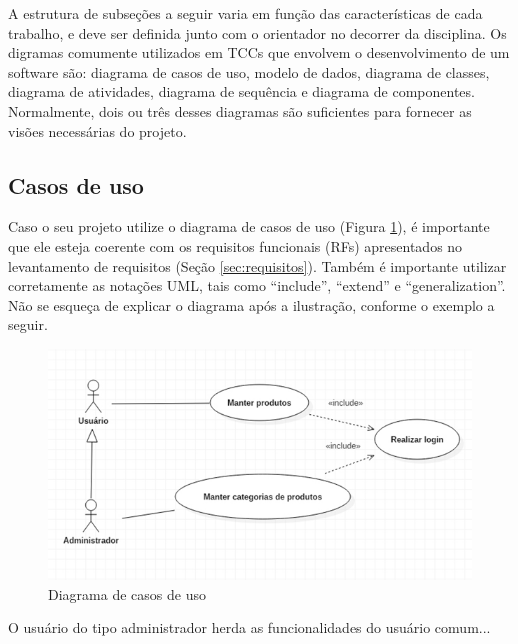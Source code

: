 A estrutura de subseções a seguir varia em função das características de cada trabalho, e deve ser definida junto com o orientador no decorrer da disciplina. Os digramas comumente utilizados em TCCs que envolvem o desenvolvimento de um software são: diagrama de casos de uso, modelo de dados, diagrama de classes, diagrama de atividades, diagrama de sequência e diagrama de componentes. Normalmente, dois ou três desses diagramas são suficientes para fornecer as visões necessárias do projeto.

\subsection{Casos de uso} 

Caso o seu projeto utilize o diagrama de casos de uso (Figura \ref{fig:Fig_2}), é importante que ele esteja coerente com os requisitos funcionais (RFs) apresentados no levantamento de requisitos (Seção \ref{sec:requisitos}). Também é importante utilizar corretamente as notações UML, tais como “include”, “extend” e “generalization”. Não se esqueça de explicar o diagrama após a ilustração, conforme o exemplo a seguir.

\begin{figure}[htb]
	\begin{center}
		\includegraphics{images/figura2.png}
	\end{center}
	\caption{\label{fig:Fig_2}Diagrama de casos de uso}
\end{figure}

O usuário do tipo administrador herda as funcionalidades do usuário comum... 

